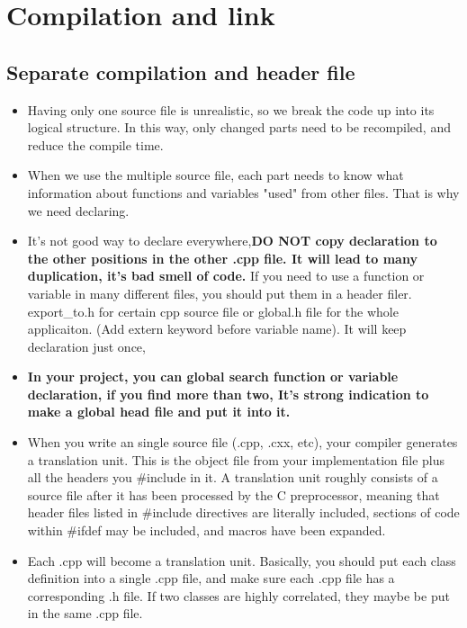 \documentclass[a4paper,11pt,twoside]{book}
\begin{document}
\section{Compilation and link}

\subsection{Separate compilation and header file}
\begin{itemize}
	\item Having only one source file is unrealistic, so we break the code up into its logical structure. In this way, only changed parts need to be recompiled, and reduce the compile time.
	
	\item When we use the multiple source file, each part needs to know what information about functions and variables "used" from other files. That is why we need declaring.
	
	\item It's not good way to declare everywhere,\textbf{DO NOT copy declaration to the other positions in the other .cpp file. It will lead to many duplication, it's bad smell of code.} If you need to use a function or variable in many different files, you should put them in a header filer. export\_to.h for certain cpp source file or global.h file for the whole applicaiton.  (Add extern keyword before variable name).  It will keep declaration just once, 
	
	\item \textbf{In your project, you can global search function or variable declaration, if you find more than two, It's strong indication to make a global head file and put it into it.}
	
	\item When you write an single source file (.cpp, .cxx, etc),  your compiler generates a translation unit. This is the object file from your implementation file plus all the headers you \#include in it.  A translation unit roughly consists of a source file after it has been processed by the C preprocessor, meaning that header files listed in \#include directives are literally included, sections of code within \#ifdef may be included, and macros have been expanded.
	
	\item Each .cpp will become a translation unit. Basically, you should put each class definition into a single .cpp file, and make sure each .cpp file has a corresponding .h file.  If two classes are highly correlated, they maybe be put in the same .cpp file.
	

\end{itemize}
\end{document}
